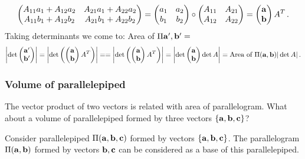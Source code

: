 \documentclass[12pt]{article}
\numberwithin{equation}{section}
\begin{document}
{$$\begin{pmatrix}
          A_{11}a_1+A_{12}a_2 &
          A_{21}a_1+A_{22}a_2\cr
          A_{11}b_1+A_{12}b_2 &
          A_{21}b_1+A_{22}b_2\cr
       \end{pmatrix}=
    \begin{pmatrix}
    a_1 &a_2\cr
    b_1 &b_2\cr
     \end{pmatrix} \circ
              \begin{pmatrix}
          A_{11} &A_{21}\cr
          A_{12} &A_{22}\cr
       \end{pmatrix}
           =
\begin{pmatrix}
    {\bf a}\cr
        {\bf b}\cr
     \end{pmatrix}
               A^T\,.
               $$
Taking determinants we come to:
 Area of $\Pi{{\bf a}',{\bf b}'}=$
                 $$
           \left|
\det\left(\begin{matrix}
    {\bf a}'\cr
        {\bf b}'\cr
     \end{matrix}
\right)
        \right|
      =     \left|
\det\left(\begin{pmatrix}
    {\bf a}\cr
        {\bf b}\cr
     \end{pmatrix}A^T
\right)
        \right|=
       =     \left|
\det\left(\begin{pmatrix}
    {\bf a}\cr
        {\bf b}\cr
     \end{pmatrix}A^T
\right)
        \right|= 
       \left|
\det\left(\begin{matrix}
    {\bf a}\cr
        {\bf b}\cr
     \end{matrix}
\right)
\det A
        \right|=
     \hbox{Area of $\Pi({\bf a},{\bf b})$}
|\det A|\,.
            $$
}
\subsubsection {Volume of parallelepiped }



The vector product of two vectors is related with area of parallelogram.
What about a volume of parallelepiped formed by three vectors $\{{\bf a},{\bf b},{\bf c}\}$?

Consider  parallelepiped $\Pi({\bf a},{\bf b},{\bf c})$ 
formed by vectors  $\{{\bf a},{\bf b},{\bf c}\}$. The parallelogram
$\Pi({\bf a},{\bf b})$ 
formed by vectors ${\bf b},{\bf c}$ can be considered as a base 
of this parallelepiped.
\end{document}
